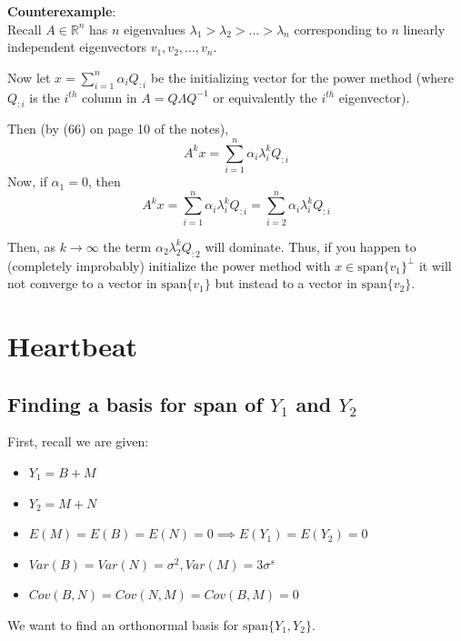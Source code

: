 \documentclass[paper=a4, fontsize=11pt]{scrartcl} %
\numberwithin{equation}{section} %
\numberwithin{figure}{section} %
\numberwithin{table}{section} %
\begin{document}
\textbf{Counterexample}:\\

Recall $A \in \mathbb{R}^n$ has $n$ eigenvalues $\lambda_1 > \lambda_2 > ... > \lambda_n$ corresponding to $n$ linearly independent eigenvectors $v_1, v_2, ..., v_n$.

Now let $x = \sum_{i = 1}^n \alpha_i Q_{:i}$ be the initializing vector for the power method (where $Q_{:i}$ is the $i^{th}$ column in $A = Q \Lambda Q^{-1}$ or equivalently the $i^{th}$ eigenvector).

Then (by (66) on page 10 of the notes),
\[A^k x = \sum_{i = 1}^n \alpha_i \lambda_i^k Q_{:i}\]
Now, if $\alpha_1 = 0$, then
\[A^k x = \sum_{i = 1}^n \alpha_i \lambda_i^k Q_{:i} = \sum_{i = 2}^n \alpha_i \lambda_i^k Q_{:i}\]

Then, as $k \to \infty$ the term $\alpha_2 \lambda_2^k Q_{:2}$ will dominate. Thus, if you happen to (completely improbably) initialize the power method with $x \in \textrm{span}\{v_1\}^\bot$ it will not converge to a vector in $\textrm{span}\{v_1\}$ but instead to a vector in $\textrm{span}\{v_2\}$.


\section{Heartbeat}

\subsection{Finding a basis for span of $Y_1$ and $Y_2$}

First, recall we are given:
\begin{itemize}
\item $Y_1 = B + M$
\item $Y_2 = M + N$
\item $E(M) = E(B) = E(N) = 0 \implies E(Y_1) = E(Y_2) = 0$
\item $Var(B) = Var(N) = \sigma^2, Var(M) = 3\sigma^s$
\item $Cov(B,N) = Cov(N,M) = Cov(B,M) = 0$
\end{itemize}

We want to find an orthonormal basis for $\textrm{span}\{Y_1, Y_2\}$.
\end{document}
